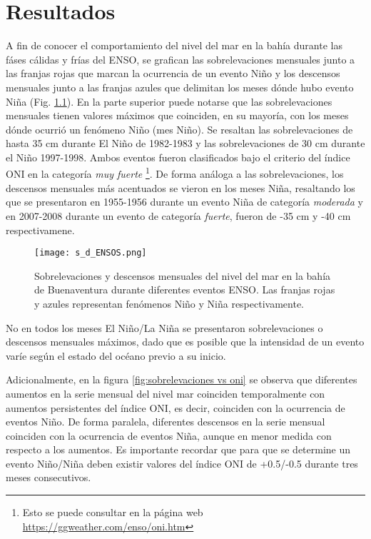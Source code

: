 \chapter{Resultados}

A fin de conocer el comportamiento del nivel del mar en la bahía durante las fáses cálidas y frías del ENSO, se grafican las sobrelevaciones mensuales junto a las franjas rojas que marcan la ocurrencia de un evento Niño y los descensos mensuales junto a las franjas azules que delimitan los meses dónde hubo evento Niña (Fig. \ref{fig:s_d_ENSOS}). En la parte superior puede notarse que las sobrelevaciones  mensuales tienen valores máximos que coinciden, en su mayoría, con los meses dónde ocurrió un fenómeno Niño (mes Niño). Se resaltan las sobrelevaciones de hasta 35 cm durante El Niño de 1982-1983 y las sobrelevaciones de 30 cm durante el Niño 1997-1998. Ambos eventos fueron clasificados bajo el criterio del índice ONI en la categoría \textit{muy fuerte} \footnote{Esto se puede consultar en la página web \url{https://ggweather.com/enso/oni.htm}}. De forma análoga a las sobrelevaciones, los descensos mensuales más acentuados se vieron en los meses Niña, resaltando los que se presentaron en 1955-1956 durante un evento Niña de categoría \textit{moderada} y en 2007-2008 durante un evento de categoría \textit{fuerte}, fueron de -35 cm y -40 cm respectivamene.

\begin{figure}[H]
	\centering
	\texttt{[image: s\_d\_ENSOS.png]}
	\caption{Sobrelevaciones y descensos mensuales del nivel del mar en la bahía de Buenaventura durante diferentes eventos ENSO. Las franjas rojas y azules representan fenómenos Niño y Niña respectivamente.}
	\label{fig:s_d_ENSOS}
\end{figure}

No en todos los meses El Niño/La Niña se presentaron sobrelevaciones o descensos mensuales máximos, dado que es posible que la intensidad de un evento varíe según el estado del océano previo a su inicio.

Adicionalmente, en la figura \ref{fig:sobrelevaciones vs oni} se observa que diferentes aumentos en la serie mensual del nivel mar coinciden temporalmente con aumentos persistentes del índice ONI, es decir, coinciden con la ocurrencia de eventos Niño. De forma paralela, diferentes descensos en la serie mensual coinciden con la ocurrencia de eventos Niña, aunque en menor medida con respecto a los aumentos. Es importante recordar que para que se determine un evento Niño/Niña deben existir valores del índice ONI de +0.5/-0.5 durante tres meses consecutivos.

